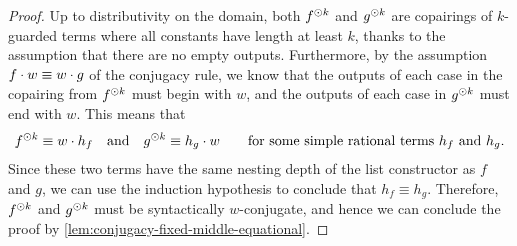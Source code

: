 \begin{proof}
Up to distributivity on the domain, both $f^{\odot k}$ and $g^{\odot k}$ are copairings of $k$-guarded terms where all constants have length at least $k$, thanks to the assumption that there are no empty outputs.  Furthermore, by the assumption $f \cdot w \equiv w \cdot g$ of the conjugacy rule, we know that the outputs of each case in the copairing from  $f^{\odot k}$ must  begin with $w$, and the outputs of each case in $g^{\odot k}$ must end with $w$. This means that 
\begin{align*}
f^{\odot k} \equiv w \cdot h_f 
\quad \text{and} \quad 
g^{\odot k} \equiv h_g \cdot w
\qquad \text{for some simple rational terms $h_f$ and $h_g$.}
\end{align*}
Since these two terms have the same nesting depth of the list constructor as $f$ and $g$, we can use the induction hypothesis to conclude that $h_f \equiv h_g$. Therefore, $f^{\odot k}$ and  $g^{\odot k}$ must be syntactically $w$-conjugate, and hence we can conclude the proof by \cref{lem:conjugacy-fixed-middle-equational}.
\end{proof}
